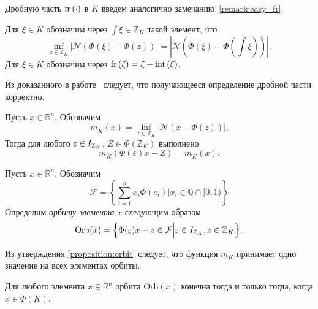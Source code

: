 \documentclass[_00_dissertation.tex]{subfiles}
\begin{document}
Дробную часть $\textrm{fr}\left(\cdot\right)$ в $K$ введем аналогично замечанию~\ref{remark:easy_fr}.

\begin{definition}
    Для $\xi \in K$ обозначим через $\int{\xi} \in \mathbb{Z}_K$ такой элемент, что
    \begin{equation*}
        \inf\limits_{z\in\mathbb{Z}_K} |\mathcal{N}(\Phi(\xi) - \Phi(z))| = |\mathcal{N}(\Phi(\xi) - \Phi(\int{\xi}))|.
    \end{equation*}
    Для $\xi \in K$ обозначим через $\textrm{fr}\left(\xi\right) = \xi - \textrm{int}\left(\xi\right)$.
\end{definition}

Из доказанного в работе~\cite{source:Lezowski} следует, что получающееся определение дробной части корректно.

\begin{proposition}\label{proposition:orbit}\cite{source:Lezowski}
    Пусть $x \in \mathbb{R}^n$.
    Обозначим
    \begin{equation*}
        m_{\overline{K}}(x) = \inf_{z\in\mathbb{Z}_K} |\mathcal{N}(x - \Phi(z))|.
    \end{equation*}
    Тогда для любого $\varepsilon \in I_{\mathbb{Z}_K}$, $Z \in \Phi(\mathbb{Z}_K)$ выполнено
    \begin{equation*}
        m_{\overline{K}}(\Phi(\varepsilon)x - Z) = m_{\overline{K}}(x).
    \end{equation*}
\end{proposition}

\begin{definition}
    Пусть $x\in \mathbb{R}^n$.
    Обозначим
    \begin{equation*}
        \mathcal{F} = \left\{
            \sum\limits_{i=1}^n x_i\Phi(e_i) \Big| x_i \in \mathbb{Q}\cap[0, 1)
        \right\}
    \end{equation*}
    Определим \emph{орбиту элемента} $x$ следующим образом 
    \begin{equation*}
        \textrm{Orb}(x) = \left\{
        \Phi(\varepsilon)x - z \in \mathcal{F} \Big| \varepsilon \in I_{\mathbb{Z}_K}, z \in \mathbb{Z}_K
    \right\}.
    \end{equation*}
\end{definition}

Из утверждения \ref{proposition:orbit} следует, что функция $m_{\overline{K}}$ принимает одно значение на всех элементах орбиты.

\begin{proposition}\cite{source:Lezowski}
    Для любого элемента $x\in \mathbb{R}^n$ орбита $\textrm{Orb}(x)$ конечна тогда и только тогда, когда $x \in \Phi(K)$.
\end{proposition}
\end{document}
